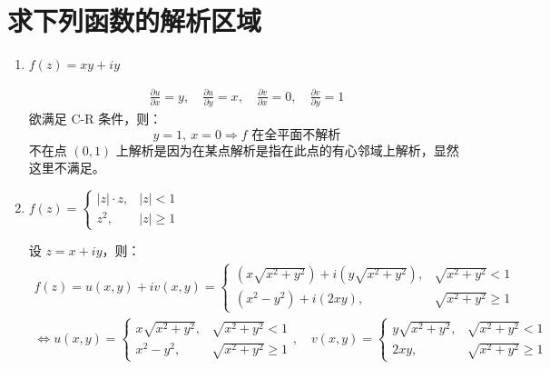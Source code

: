 \documentclass[UTF8]{report}
\theoremstyle{MyLineTheoremStyle} %
\theoremstyle{MyBlockTheoremStyle} %
\theoremstyle{MySubsubsectionStyle} %
\begin{document}
\section{求下列函数的解析区域}
\begin{enumerate}
\item $f(z) = xy+iy$

\begin{gather*}
\frac{\partial u }{\partial x } = y, \quad \frac{\partial u }{\partial y } = x ,\quad 
\frac{\partial v }{\partial x } = 0, \quad \frac{\partial v }{\partial y } = 1
\end{gather*}
欲满足 C-R 条件，则：
\begin{equation*}
y=1,\  x = 0 \Longrightarrow \text{$f$ 在全平面不解析}
\end{equation*}
不在点 $(0,1)$ 上解析是因为在某点解析是指在此点的有心邻域上解析，显然这里不满足。

\item  $ f(z) = \begin{cases}
    | z | \cdot z, &| z | <1 \\ 
    z^2,  &|z|  \geqslant 1
\end{cases} $ 

设 $z = x +iy$，则：
\begin{gather*}
f(z) = u(x,y) + iv(x,y) = 
\begin{cases}
    (x\sqrt{x^2+y^2}) + i(y\sqrt{x^2+y^2}), &\sqrt{x^2+y^2} < 1 \\ 
    (x^2 - y^2) + i(2xy), &\sqrt{x^2+y^2} \geqslant 1
\end{cases} \\ 
\Longleftrightarrow 
u(x,y) = 
\begin{cases}
    x\sqrt{x^2+y^2},&  \sqrt{x^2+y^2} < 1 \\ 
    x^2 - y^2, & \sqrt{x^2+y^2} \geqslant 1
\end{cases} ,\quad
v(x,y) = 
\begin{cases}
    y\sqrt{x^2+y^2}, & \sqrt{x^2+y^2} < 1 \\ 
    2xy, & \sqrt{x^2+y^2} \geqslant 1
\end{cases} 
\end{gather*}


\end{enumerate}
\end{document}
